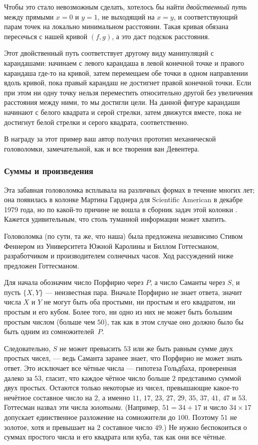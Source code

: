 Чтобы это стало невозможным сделать, хотелось бы найти \emph{двойственный путь} между прямыми $x = 0$ и $y = 1$, не выходящий на $x = y$, и соответствующий парам точек на локально минимальном расстоянии.
Такая кривая обязана пересечься с нашей кривой $(f, g)$, а это даст подскок расстояния.

Этот двойственный путь соответствует другому виду манипуляций с карандашами:
начинаем с левого карандаша в левой конечной точке и правого карандаша где-то на кривой,
затем перемещаем обе точки в одном направлении вдоль кривой, пока правый карандаш не достигнет правой конечной точки.
Если при этом ни одну точку нельзя переместить относительно другой без увеличения расстояния между ними, то мы достигли цели.
На данной фигуре карандаши начинают с белого квадрата и серой стрелки, затем движутся вместе, пока не достигнут белой стрелки и серого квадрата, соответственно.

\medskip

В награду за этот пример ваш автор получил прототип механической головоломки, замечательной, как и все творения ван Девентера.

\subsubsection*{Суммы и произведения}

Эта забавная головоломка всплывала на различных формах в течение многих лет; она появилась в колонке Мартина Гарднера для Scientific American в декабре 1979 года, но по какой-то причине не вошла в сборник задач этой колонки \cite{29}.
Кажется удивительным, что столь туманной информации может хватить.

Головоломка (по сути, та же, что наша) была предложена независимо Стивом Феннером из Университета Южной Каролины и Биллом Готтесманом, разработчиком и производителем солнечных часов.
Ход рассуждений ниже предложен Готтесманом.

Для начала обозначим число Порфирио через $P$, а число Саманты через $S$, и пусть $\{X, Y\}$ --- неизвестная пара.
Вначале Порфирио не знает ответа, значит числа $X$ и $Y$ не могут быть оба простыми,
ни простым и его квадратом,
ни простым и его кубом.
Более того, ни одно из них не может быть большим простым числом (больше чем $50$), так как в этом случае оно должно было бы быть одним из сомножителей~$P$.

Следовательно, $S$ не может превысить $53$ или же быть равным сумме двух простых чисел, --- ведь Саманта заранее знает, что Порфирио не может знать ответ.
Это исключает все чётные числа --- гипотеза Гольдбаха, проверенная далеко за $53$, гласит, что каждое чётное число больше $2$ представимо суммой двух простых.
Остаются только некоторые из чисел, превышающие какое-то нечётное составное число на $2$, а именно $11$, $17$, $23$, $27$, $29$, $35$, $37$, $41$, $47$ и $53$.
Готтесман назвал эти числа \emph{золотыми}.
(Например, $51=34+17$ и число $34\times 17$ допускает единственное разложение на сомножители до $100$. Поэтому $51$ не золотое, хотя и превышает на $2$ составное число $49$.)
Не нужно беспокоиться о суммах простого числа и его квадрата или куба, так как они все чётные.

